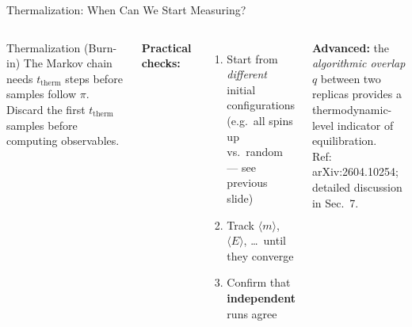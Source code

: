 \documentclass[10pt,aspectratio=169]{beamer}
\begin{document}
\begin{frame}{Thermalization: When Can We Start Measuring?}
  \begin{columns}[T]
    \begin{block}{Thermalization (Burn-in)}
      The Markov chain needs $t_{\mathrm{therm}}$ steps before samples follow $\pi$.
      Discard the first $t_{\mathrm{therm}}$ samples before computing observables.
    \end{block}
    \vspace{0.3em}
    \textbf{Practical checks:}
    \begin{enumerate}
      \item Start from \emph{different} initial configurations\\
            (e.g.\ all spins up vs.\ random — see previous slide)
      \item Track $\langle m \rangle$, $\langle E \rangle$, \ldots\ until they converge
      \item Confirm that \textbf{independent} runs agree
    \end{enumerate}
    \vspace{0.3em}
    {\small\textbf{Advanced:} the \emph{algorithmic overlap} $q$ between two replicas provides a thermodynamic-level indicator of equilibration.\\[2pt]
    \footnotesize Ref: arXiv:2604.10254; detailed discussion in Sec.~7.}

    \centering
  \end{columns}
\end{frame}
\end{document}
